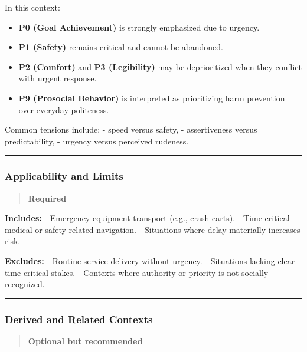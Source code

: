 \documentclass[utf8]{frontiers_suppmat} %
\providecommand{\tightlist}{%
  \setlength{\itemsep}{0pt}\setlength{\parskip}{0pt}}
\begin{document}
In this context:

\begin{itemize}
\tightlist
\item
  \textbf{P0 (Goal Achievement)} is strongly emphasized due to urgency.
\item
  \textbf{P1 (Safety)} remains critical and cannot be abandoned.
\item
  \textbf{P2 (Comfort)} and \textbf{P3 (Legibility)} may be
  deprioritized when they conflict with urgent response.
\item
  \textbf{P9 (Prosocial Behavior)} is interpreted as prioritizing harm
  prevention over everyday politeness.
\end{itemize}

Common tensions include: - speed versus safety, - assertiveness versus
predictability, - urgency versus perceived rudeness.

\begin{center}\rule{0.5\linewidth}{0.5pt}\end{center}

\subsubsection{Applicability and Limits}\label{applicability-and-limits}

\begin{quote}
\textbf{Required}
\end{quote}

\textbf{Includes:} - Emergency equipment transport (e.g., crash carts).
- Time-critical medical or safety-related navigation. - Situations where
delay materially increases risk.

\textbf{Excludes:} - Routine service delivery without urgency. -
Situations lacking clear time-critical stakes. - Contexts where
authority or priority is not socially recognized.

\begin{center}\rule{0.5\linewidth}{0.5pt}\end{center}

\subsubsection{Derived and Related
Contexts}\label{derived-and-related-contexts}

\begin{quote}
\textbf{Optional but recommended}
\end{quote}
\end{document}
